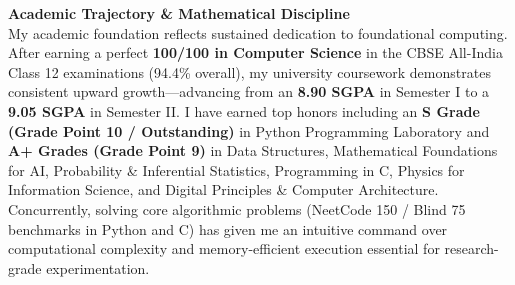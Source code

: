 \documentclass[letterpaper,10pt]{article}
\begin{document}
\vspace{2.5pt}
\noindent\textbf{Academic Trajectory \& Mathematical Discipline} \\
My academic foundation reflects sustained dedication to foundational computing. After earning a perfect \textbf{100/100 in Computer Science} in the CBSE All-India Class 12 examinations (94.4\% overall), my university coursework demonstrates consistent upward growth—advancing from an \textbf{8.90 SGPA} in Semester I to a \textbf{9.05 SGPA} in Semester II. I have earned top honors including an \textbf{S Grade (Grade Point 10 / Outstanding)} in Python Programming Laboratory and \textbf{A+ Grades (Grade Point 9)} in Data Structures, Mathematical Foundations for AI, Probability \& Inferential Statistics, Programming in C, Physics for Information Science, and Digital Principles \& Computer Architecture. Concurrently, solving core algorithmic problems (NeetCode 150 / Blind 75 benchmarks in Python and C) has given me an intuitive command over computational complexity and memory-efficient execution essential for research-grade experimentation.
\end{document}
